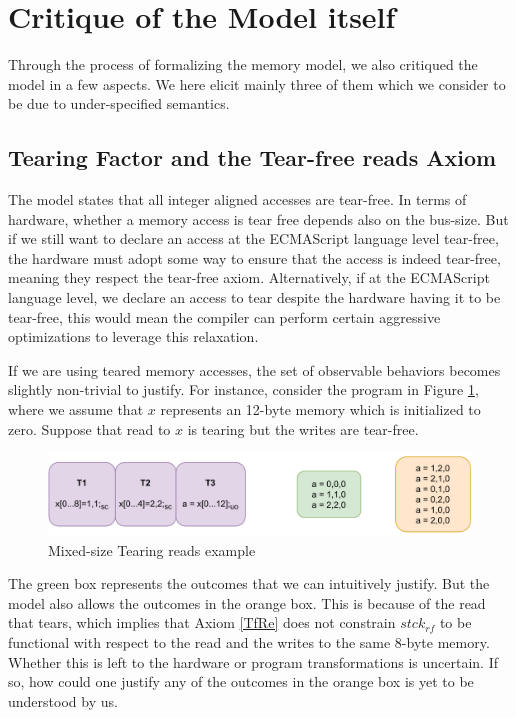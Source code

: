 \section{Critique of the Model itself}

    Through the process of formalizing the memory model, we also critiqued the model in a few aspects. 
    We here elicit mainly three of them which we consider to be due to under-specified semantics.

    \subsection{Tearing Factor and the Tear-free reads Axiom}

        The model states that all integer aligned accesses are tear-free.  
        In terms of hardware, whether a memory access is tear free depends also on the bus-size.
        But if we still want to declare an access at the ECMAScript language level tear-free, the hardware must adopt some way to ensure that the access is indeed tear-free, meaning they respect the tear-free axiom.
        Alternatively, if at the ECMAScript language level, we declare an access to tear despite the hardware having it to be tear-free, this would mean the compiler can perform certain aggressive optimizations to leverage this relaxation. 

        If we are using teared memory accesses, the set of observable behaviors becomes slightly non-trivial to justify.
        For instance, consider the program in Figure \ref{crit:tearing}, where we assume that $x$ represents an 12-byte memory which is initialized to zero. 
        Suppose that read to $x$ is tearing but the writes are tear-free.
        \begin{figure}[H]
            \centering
            \includegraphics[scale=0.7]{7.ConclusionFutureWork/TearingExample.pdf}
            \caption{Mixed-size Tearing reads example}
            \label{crit:tearing}
        \end{figure}

        The green box represents the outcomes that we can intuitively justify.
        But the model also allows the outcomes in the orange box. 
        This is because of the read that tears, which implies that Axiom \ref{TfRe} does not constrain $stck{_{rf}}$ to be functional with respect to the read and the writes to the same 8-byte memory. 
        Whether this is left to the hardware or program transformations is uncertain.
        If so, how could one justify any of the outcomes in the orange box is yet to be understood by us. 

